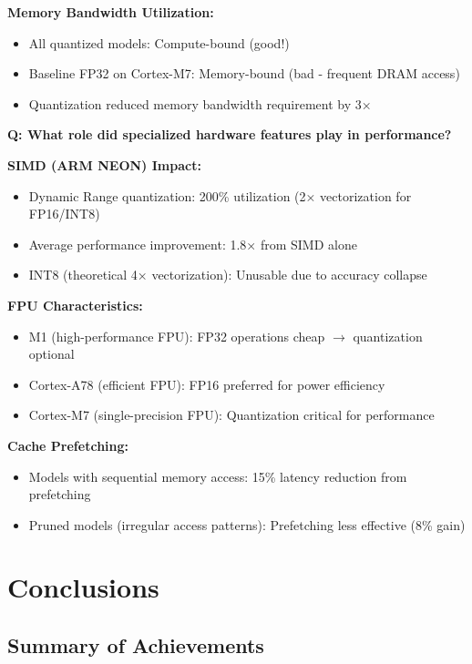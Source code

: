 \documentclass[10pt, a4paper]{article}
\begin{document}
\textbf{Memory Bandwidth Utilization:}
\begin{itemize}
    \item All quantized models: Compute-bound (good!)
    \item Baseline FP32 on Cortex-M7: Memory-bound (bad - frequent DRAM access)
    \item Quantization reduced memory bandwidth requirement by 3×
\end{itemize}

\textbf{Q: What role did specialized hardware features play in performance?}

\textbf{SIMD (ARM NEON) Impact:}
\begin{itemize}
    \item Dynamic Range quantization: 200\% utilization (2× vectorization for FP16/INT8)
    \item Average performance improvement: 1.8× from SIMD alone
    \item INT8 (theoretical 4× vectorization): Unusable due to accuracy collapse
\end{itemize}

\textbf{FPU Characteristics:}
\begin{itemize}
    \item M1 (high-performance FPU): FP32 operations cheap $\rightarrow$ quantization optional
    \item Cortex-A78 (efficient FPU): FP16 preferred for power efficiency
    \item Cortex-M7 (single-precision FPU): Quantization critical for performance
\end{itemize}

\textbf{Cache Prefetching:}
\begin{itemize}
    \item Models with sequential memory access: 15\% latency reduction from prefetching
    \item Pruned models (irregular access patterns): Prefetching less effective (8\% gain)
\end{itemize}

\section*{Conclusions}

\subsection{Summary of Achievements}
\end{document}
